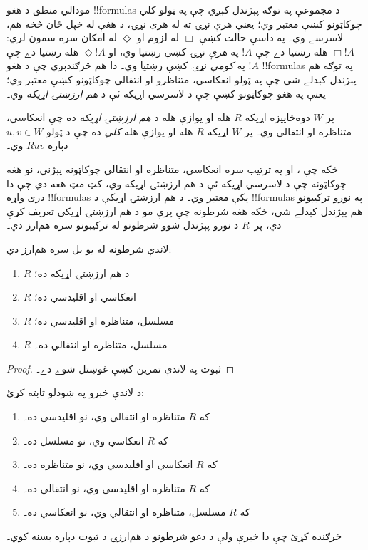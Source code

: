 \documentclass[../../../include/open-logic-section]{subfiles}
\begin{document}


مودالي منطق  د هغو !!{formula}s د مجموعې په توګه پېژندل
کېږي چې په ټولو کلي چوکاټونو کښې معتبر وي؛ يعنې هرې نړۍ ته له هرې
نړۍ، د هغې له خپل ځان څخه هم، لاسرسے وي۔ په داسې حالت کښې
$\Box$ له لزوم او $\Diamond$ له امکان سره سمون لري: $\Box !A$
هله رښتيا دے چې $!A$ په \emph{هرې} نړۍ کښې رښتيا وي، او
$\Diamond !A$ هله رښتيا دے چې $!A$ په \emph{کومې} نړۍ کښې
رښتيا وي۔ دا هم څرګندېږي چې  د هغو !!{formula}s په
توګه هم پېژندل کېدلے شي چې په ټولو انعکاسي، متناظرو او انتقالي
چوکاټونو کښې معتبر وي؛ يعنې په هغو چوکاټونو کښې چې د لاسرسي
اړيکه ئې د \emph{هم ارزښتۍ اړيکه} وي۔

\begin{defn}
  پر $W$ دوه‌ځاييزه اړيکه $R$ هله او يوازې هله د
  \emph{هم ارزښتۍ اړيکه} ده چې انعکاسي، متناظره او انتقالي وي۔
  پر $W$ اړيکه $R$ هله او يوازې هله \emph{کلي} ده چې د ټولو
  $u,v \in W$ دپاره $Ruv$ وي۔
\end{defn}

ځکه چې ،  او  په ترتيب سره انعکاسي،
متناظره او انتقالي چوکاټونه پېژني، نو هغه چوکاټونه چې د لاسرسي
اړيکه ئې د هم ارزښتۍ اړيکه وي، کټ مټ هغه دي چې دا درې واړه
!!{formula}s پکې معتبر وي۔ د هم ارزښتۍ اړيکې د !!{formula}s
په نورو ترکيبونو هم پېژندل کېدلے شي، ځکه هغه شرطونه چې پرې مو
د هم ارزښتۍ اړيکې تعريف کړې دي، پر~$R$ د نورو پېژندل شوو
شرطونو له ترکيبونو سره هم‌ارز دي۔

\begin{prop}
  لاندې شرطونه له يو بل سره هم‌ارز دي:
  \begin{enumerate}
  \item $R$ د هم ارزښتۍ اړيکه ده؛
  \item $R$ انعکاسي او اقليدسي ده؛
  \item $R$ مسلسل، متناظره او اقليدسي ده؛
  \item $R$ مسلسل، متناظره او انتقالي ده۔
  \end{enumerate}
\end{prop}

\begin{proof}
  ثبوت په لاندې تمرين کښې غوښتل شوے دے۔
\end{proof}

\begin{prob}
  د لاندې خبرو په ښودلو 
  ثابته کړئ:
  \begin{enumerate}
  \item که $R$ متناظره او انتقالي وي، نو اقليدسي ده۔
  \item که $R$ انعکاسي وي، نو مسلسل ده۔
  \item که $R$ انعکاسي او اقليدسي وي، نو متناظره ده۔
  \item که $R$ متناظره او اقليدسي وي، نو انتقالي ده۔
  \item که $R$ مسلسل، متناظره او انتقالي وي، نو انعکاسي ده۔
  \end{enumerate}
  څرګنده کړئ چې دا خبرې ولې د دغو شرطونو د هم‌ارزۍ د ثبوت
  دپاره بسنه کوي۔
\end{prob}
\end{document}
